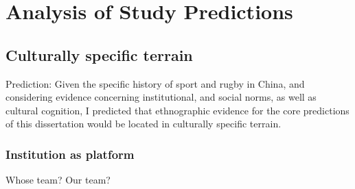 \section{Analysis of Study Predictions}


  \subsection{Culturally specific terrain}


    Prediction: Given the specific history of sport and rugby in China, and considering evidence concerning institutional, and social norms, as well as cultural cognition, I predicted that ethnographic evidence for the core predictions of this dissertation would be located in culturally specific terrain.


    \subsubsection{Institution as platform}

Whose team? Our team?







